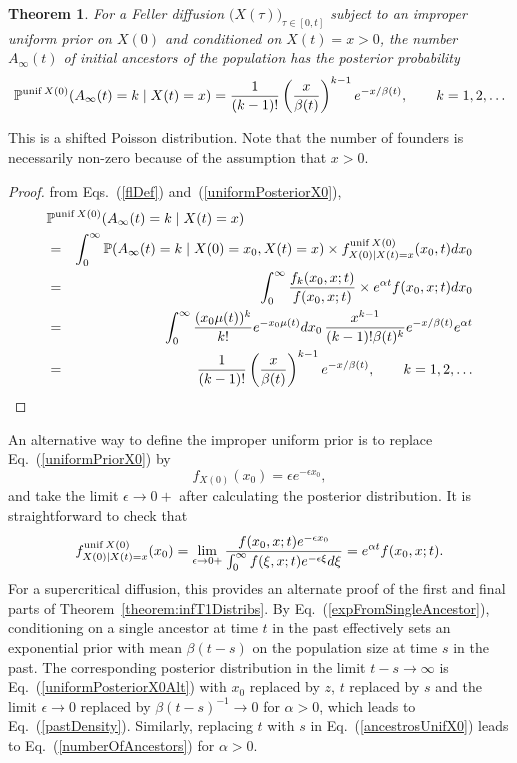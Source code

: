 \documentclass[preprint,12pt]{elsarticle}
\newtheorem{theorem}{Theorem}
\begin{document}
\begin{theorem}
For a Feller diffusion $\big(X(\tau)\big)_{\tau \in [0, t]}$ subject to an improper uniform prior on $X(0)$ and conditioned on $X(t) = x > 0$, 
the number $A_\infty(t)$ of initial ancestors of the population has the posterior probability 
\begin{equation}	\label{ancestrosUnifX0}
\mathbb{P}^{{\rm unif}\,X(0)}(A_\infty(t) = k \mid X(t) = x) = \frac{1}{(k - 1)!} \left(\frac{x}{\beta(t)}\right)^{k - 1} e^{-x/\beta(t)}, \qquad k = 1, 2, \ldots 
\end{equation}
\end{theorem}
This is a shifted Poisson distribution.  Note that the number of founders is necessarily non-zero because of the assumption that $x > 0$.  
%
\begin{proof}
from Eqs.~(\ref{flDef}) and~(\ref{uniformPosteriorX0}),
\begin{eqnarray*}
\lefteqn{\mathbb{P}^{{\rm unif}\,X(0)}(A_\infty(t) = k \mid X(t) = x)} \nonumber \\ 
	& = & \int_0^\infty \mathbb{P}(A_\infty(t) = k \mid X(0) = x_0, X(t) = x) \times f^{{\rm unif}\,X(0)}_{X(0) \mid X(t) = x}(x_0, t) dx_0 \nonumber \\ 
	& = & \int_0^\infty \frac{f_k(x_0, x; t)}{f(x_0, x; t)} \times e^{\alpha t} f(x_0, x; t) dx_0 \nonumber \\ 
	& = & \int_0^\infty \frac{(x_0 \mu(t))^k}{k!} e^{-x_0\mu(t)} dx_0 \, \frac{x^{k - 1}}{(k - 1)! \beta(t)^k} e^{-x/\beta(t)} e^{\alpha t} \nonumber \\ 
	& = & \frac{1}{(k - 1)!} \left(\frac{x}{\beta(t)}\right)^{k - 1} e^{-x/\beta(t)}, \qquad k = 1, 2, \ldots  
\end{eqnarray*}
\end{proof}

An alternative way to define the improper uniform prior is to replace Eq.~(\ref{uniformPriorX0}) by 
\[
f_{X(0)}(x_0) = \epsilon e^{-\epsilon x_0}, 
\]
and take the limit $\epsilon \to 0+$ after calculating the posterior distribution.  It is straightforward to check that 
\begin{equation}	\label{uniformPosteriorX0Alt}
f^{{\rm unif}\,X(0)}_{X(0) \mid X(t) = x}(x_0) = \lim_{\epsilon \to 0+}\frac{f(x_0, x; t) e^{-\epsilon x_0}}{\int_0^\infty f(\xi, x; t) e^{-\epsilon \xi} d\xi }
		= e^{\alpha t} f(x_0, x; t).  
\end{equation}
For a supercritical diffusion, this provides an alternate proof of the first and final parts of Theorem~\ref{theorem:infT1Distribs}.  
By Eq.~(\ref{expFromSingleAncestor}), conditioning on a single 
ancestor at time $t$ in the past effectively sets an exponential prior with mean $\beta(t - s)$ on the population size at time $s$ in the past.  The corresponding 
posterior distribution in the limit $t - s \to \infty$ is Eq.~(\ref{uniformPosteriorX0Alt}) with $x_0$ replaced by $z$, $t$ replaced by $s$ and the limit $\epsilon \to 0$ 
replaced by $\beta(t - s)^{-1} \to 0$ for $\alpha > 0$, which leads to Eq.~(\ref{pastDensity}).  Similarly, replacing $t$ with $s$ in Eq.~(\ref{ancestrosUnifX0}) leads 
to Eq.~(\ref{numberOfAncestors}) for $\alpha > 0$.  
\end{document}
